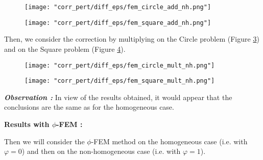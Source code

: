 \begin{enumerate}[label=\textbullet]
	\begin{minipage}{0.48\linewidth}
		\begin{figure}[H]
			\centering
			\texttt{[image: "corr\_pert/diff\_eps/fem\_circle\_add\_nh.png"]}
			\label{corr_pert_fem_circle_add_nh}
		\end{figure} 
	\end{minipage}
	\begin{minipage}{0.48\linewidth}
		\begin{figure}[H]
			\centering
			\texttt{[image: "corr\_pert/diff\_eps/fem\_square\_add\_nh.png"]}
			\label{corr_pert_fem_square_add_nh}
		\end{figure} 
	\end{minipage}
	
	Then, we consider the correction by multiplying on the Circle problem (Figure \ref{corr_pert_fem_circle_mult_nh}) and on the Square problem (Figure \ref{corr_pert_fem_square_mult_nh}).
	
	\begin{minipage}{0.48\linewidth}
		\begin{figure}[H]
			\centering
			\texttt{[image: "corr\_pert/diff\_eps/fem\_circle\_mult\_nh.png"]}
			\label{corr_pert_fem_circle_mult_nh}
		\end{figure} 
	\end{minipage}
	\begin{minipage}{0.48\linewidth}
		\begin{figure}[H]
			\centering
			\texttt{[image: "corr\_pert/diff\_eps/fem\_square\_mult\_nh.png"]}
			\label{corr_pert_fem_square_mult_nh}
		\end{figure} 
	\end{minipage}
	
	\textbf{\textit{Observation :}} In view of the results obtained, it would appear that the conclusions are the same as for the homogeneous case.
\end{enumerate}

\textbf{Results with $\phi$-FEM :}

Then we will consider the $\phi$-FEM method on the homogeneous case (i.e. with $\varphi=0$) and then on the non-homogeneous case (i.e. with $\varphi=1$).

